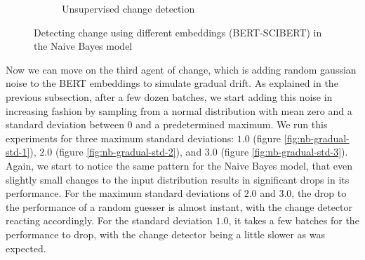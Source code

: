 \documentclass[12pt]{extreport}
\begin{document}
\begin{figure}[H]
\begin{subfigure}{.5\textwidth}
  \caption{Unsupervised change detection}
  \label{fig:nb-diff-embed-unsuper-B-S}
\end{subfigure}
\caption{Detecting change using different embeddings (BERT-SCIBERT) in the Naive Bayes model}
\label{fig:nb-diff-embed-B-S}
\end{figure}

Now we can move on the third agent of change, which is adding random gaussian noise to the BERT embeddings to simulate gradual drift. As explained in the previous subsection, after a few dozen batches, we start adding this noise in increasing fashion by sampling from a normal distribution with mean zero and a standard deviation between 0 and a predetermined maximum. We run this experiments for three maximum standard deviations: $1.0$ (figure \ref{fig:nb-gradual-std-1}), $2.0$ (figure \ref{fig:nb-gradual-std-2}), and $3.0$ (figure \ref{fig:nb-gradual-std-3}). Again, we start to notice the same pattern for the Naive Bayes model, that even slightly small changes to the input distribution results in significant drops in its performance. For the maximum standard deviations of $2.0$ and $3.0$, the drop to the performance of a random guesser is almost instant, with the change detector reacting accordingly. For the standard deviation $1.0$, it takes a few batches for the performance to drop, with the change detector being a little slower as was expected.
\end{document}
